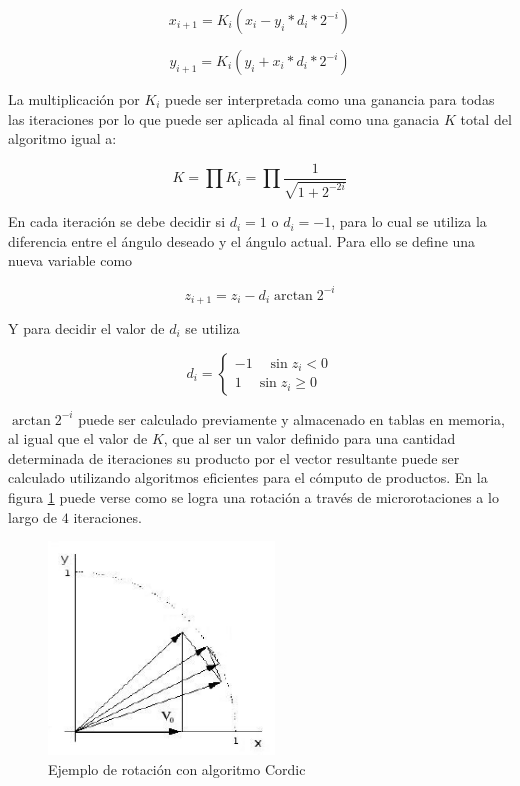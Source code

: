 \begin{equation}
x_{i+1} = K_i (x_i - y_i*d_i*2^{-i})
\label{eq:micrototXK}
\end{equation}

\begin{equation}
y_{i+1} = K_i (y_i + x_i*d_i*2^{-i})
\label{eq:micrototYK}
\end{equation}

La multiplicación por $K_i$ puede ser interpretada como una ganancia para todas las iteraciones por
lo que puede ser aplicada al final como una ganacia $K$ total del algoritmo igual a:

\begin{equation}
K = \prod K_i = \prod \frac{1}{\sqrt{1+2^{-2i}}}
\label{eq:Kprod}
\end{equation}

En cada iteración se debe decidir si $d_i = 1$ o $d_i = -1$, para lo cual se utiliza la diferencia
entre el ángulo deseado y el ángulo actual. Para ello se define una nueva variable como 

\begin{equation}
z_{i+1} = z_i - d_i \arctan 2^{-i}
\label{eq:zi}
\end{equation}

Y para decidir el valor de $d_i$ se utiliza

\begin{equation}
d_i =  
	\begin{cases}
	-1 \quad \sin z_i < 0 \\
	1 \quad \sin z_i \geq 0 
	\end{cases}
\label{eq:ni}
\end{equation}

$\arctan 2^{-i}$ puede ser calculado previamente y almacenado en tablas en memoria, al igual que el
valor de $K$, que al ser un valor definido para una cantidad determinada de iteraciones su
producto por el vector resultante puede ser calculado utilizando algoritmos eficientes para el
cómputo de productos.
En la figura \ref{fig:cordic} puede verse como se logra una rotación a través de microrotaciones a
lo largo de $4$ iteraciones.

\begin{figure}[htb!]
        \centering
        \includegraphics[width=6cm]{./figures/cordic.png}
        \caption{Ejemplo de rotación con algoritmo Cordic}
        \label{fig:cordic}
\end{figure}

